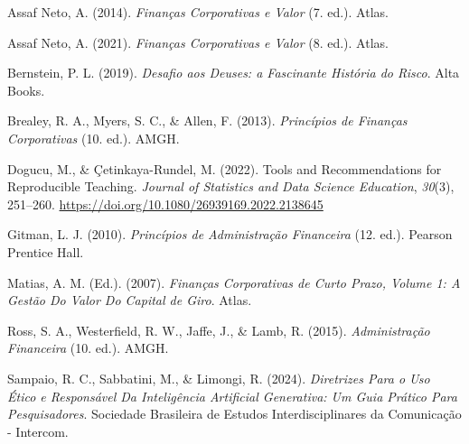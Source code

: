 \documentclass[
  a4paper,
]{book}
\newlength{\cslhangindent}
\newenvironment{CSLReferences}[2] %
 {\begin{list}{}{%
  \setlength{\itemindent}{0pt}
  \setlength{\leftmargin}{0pt}
  \setlength{\parsep}{0pt}
  \ifodd #1
   \setlength{\leftmargin}{\cslhangindent}
   \setlength{\itemindent}{-1\cslhangindent}
  \fi
  \setlength{\itemsep}{#2\baselineskip}}}
 {\end{list}}
\begin{document}

\label{refs}
\begin{CSLReferences}{1}{0}
Assaf Neto, A. (2014). \emph{Finan{ç}as Corporativas e Valor} (7. ed.).
Atlas.

Assaf Neto, A. (2021). \emph{Finan{ç}as Corporativas e Valor} (8. ed.).
Atlas.

Bernstein, P. L. (2019). \emph{{Desafio aos Deuses: a Fascinante
Hist{ó}ria do Risco}}. Alta Books.

Brealey, R. A., Myers, S. C., \& Allen, F. (2013). \emph{Princ{í}pios de
Finan{ç}as Corporativas} (10. ed.). AMGH.

Dogucu, M., \& Çetinkaya-Rundel, M. (2022). Tools and Recommendations
for Reproducible Teaching. \emph{Journal of Statistics and Data Science
Education}, \emph{30}(3), 251--260.
\url{https://doi.org/10.1080/26939169.2022.2138645}

Gitman, L. J. (2010). \emph{Princ{í}pios de Administra{ç}{ã}o
Financeira} (12. ed.). Pearson Prentice Hall.

Matias, A. M. (Ed.). (2007). \emph{Finan{ç}as Corporativas de Curto
Prazo, Volume 1: A Gest{ã}o Do Valor Do Capital de Giro}. Atlas.

Ross, S. A., Westerfield, R. W., Jaffe, J., \& Lamb, R. (2015).
\emph{Administra{ç}{ã}o Financeira} (10. ed.). AMGH.

Sampaio, R. C., Sabbatini, M., \& Limongi, R. (2024). \emph{Diretrizes
Para o Uso {É}tico e Respons{á}vel Da Intelig{ê}ncia Artificial
Generativa: Um Guia Pr{á}tico Para Pesquisadores}. Sociedade Brasileira
de Estudos Interdisciplinares da Comunica{ç}{ã}o - Intercom.

\end{CSLReferences}


\backmatter
\end{document}
